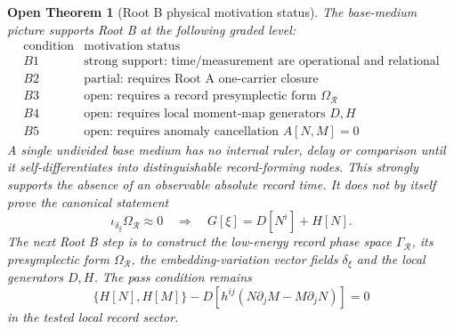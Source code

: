 \documentclass[11pt]{article}
\newtheorem{openthm}{Open Theorem}
\begin{document}
\begin{openthm}[Root B physical motivation status]
The base-medium picture supports Root B at the following graded level:
\[
\boxed{
\begin{array}{c|c}
\text{condition} & \text{motivation status}\\
\hline
B1 & \text{strong support: time/measurement are operational and relational}\\
B2 & \text{partial: requires Root A one-carrier closure}\\
B3 & \text{open: requires a record presymplectic form }\Omega_{\mathcal R}\\
B4 & \text{open: requires local moment-map generators }D,H\\
B5 & \text{open: requires anomaly cancellation }A[N,M]=0
\end{array}
}
\]
A single undivided base medium has no internal ruler, delay or comparison
until it self-differentiates into distinguishable record-forming nodes.  This
strongly supports the absence of an observable absolute record time.  It does not by itself prove the canonical statement
\[
\boxed{
\iota_{\delta_\xi}\Omega_{\mathcal R}\approx0
\quad\Rightarrow\quad
G[\xi]=D[N^i]+H[N].
}
\]
The next Root B step is to construct the low-energy record phase space
\(\Gamma_{\mathcal R}\), its presymplectic form \(\Omega_{\mathcal R}\), the
embedding-variation vector fields \(\delta_\xi\) and the local generators
\(D,H\).  The pass condition remains
\[
\boxed{
\{H[N],H[M]\}
-
D\!\left[h^{ij}(N\partial_jM-M\partial_jN)\right]
=0
}
\]
in the tested local record sector.
\end{openthm}
\end{document}
